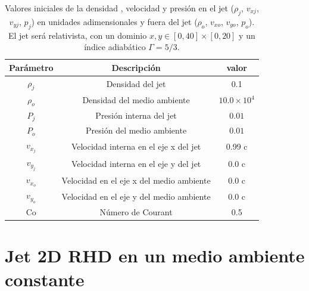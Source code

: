 \documentclass[12pt,a4paper]{book}
\begin{document}
\begin{table}[htbp]
\begin{center}
\begin{tabular}{|c|c|c|}
\hline 
\textbf{Parámetro} & \textbf{Descripción} & \textbf{valor} \\ 
\hline 
$\rho_{j}$ &  Densidad del jet & 0.1  \\ 
\hline 
$\rho_{o}$ &  Densidad del medio ambiente & $10.0 \times 10^{4}$   \\
\hline 
$P_{j}$ & Presión interna del jet& $0.01 $ \\ 
\hline 
$P_{o}$ &  Presión del medio ambiente & $0.01 $  \\ 
\hline 
$v_{x_{j}}$ & Velocidad interna en el eje x del jet & 0.99 c \\ 
\hline 
$v_{y_{j}}$ & Velocidad interna en el eje y del jet & 0.0 c \\ 
\hline 
$v_{x_{o}}$ & Velocidad en el eje x del medio ambiente & 0.0 c \\
\hline 
$v_{y_{o}}$ & Velocidad en el eje y del medio ambiente & 0.0 c \\ 
\hline 
Co & Número de Courant & 0.5 \\ 
\hline 
\end{tabular}
\caption{\label{Cuadro: propiedades-jet-comparacion} Valores iniciales de la densidad ,
velocidad  y presión  en el jet ($\rho_j$, $v_{xj}$, $v_{yj}$, $p_j$) {\color {red} en unidades adimensionales} y fuera del jet 
($\rho_o$, $v_{xo}$, $v_{yo}$, $p_o$). El jet será relativista, con un dominio 
$x, y \in [0,40]\times[0,20]$ y un índice adiabático $\Gamma = 5/3$.}
\end{center}
\end{table}

\section{Jet 2D RHD en un medio ambiente constante}
\end{document}
